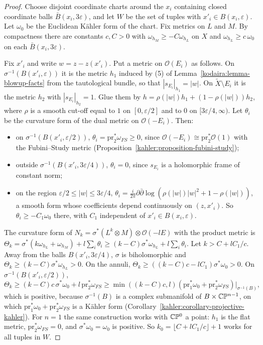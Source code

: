 \begin{proof}
Choose disjoint coordinate charts around the $x_i$ containing closed coordinate balls $\bar B(x_i, 3\varepsilon)$, and let $W$ be the set of tuples with
$x'_i \in B(x_i, \varepsilon)$. Let $\omega_0$ be the Euclidean K\"ahler form of the chart. Fix metrics on $L$ and $M$. By compactness there are
constants $c, C > 0$ with $\omega_{h_M} \geq -C\omega_{h_L}$ on $X$ and $\omega_{h_L} \geq c\,\omega_0$ on each $\bar B(x_i, 3\varepsilon)$.

Fix $x'_i$ and write $w = z - z(x'_i)$. Put a metric on $\mathcal{O}(E_i)$ as follows. On $\sigma^{-1}(B(x'_i, \varepsilon))$ it is the metric $h_1$
induced by (5) of Lemma~\ref{kodaira:lemma-blowup-facts} from the tautological bundle, so that $|s_{E_i}|_{h_1} = |w|$. On $\tilde X \setminus E_i$ it is
the metric $h_2$ with $|s_{E_i}|_{h_2} = 1$. Glue them by $h = \rho(|w|)h_1 + (1 - \rho(|w|))h_2$, where $\rho$ is a smooth cut-off equal to $1$ on
$[0, \varepsilon/2]$ and to $0$ on $[3\varepsilon/4, \infty)$. Let $\theta_i$ be the curvature form of the dual metric on $\mathcal{O}(-E_i)$. Then:
\begin{itemize}
\item on $\sigma^{-1}(B(x'_i, \varepsilon/2))$, $\theta_i = \mathrm{pr}_2^*\omega_{FS} \geq 0$, since $\mathcal{O}(-E_i) \cong \mathrm{pr}_2^*\mathcal{O}(1)$ with the
Fubini--Study metric (Proposition~\ref{kahler:proposition-fubini-study});
\item outside $\sigma^{-1}(B(x'_i, 3\varepsilon/4))$, $\theta_i = 0$, since $s_{E_i}$ is a holomorphic frame of constant norm;
\item on the region $\varepsilon/2 \leq |w| \leq 3\varepsilon/4$, $\theta_i = \frac{i}{2\pi}\partial\bar\partial\log\left(\rho(|w|)|w|^2 + 1 - \rho(|w|)\right)$, a
smooth form whose coefficients depend continuously on $(z, x'_i)$. So $\theta_i \geq -C_1\omega_0$ there, with $C_1$ independent of
$x'_i \in B(x_i, \varepsilon)$.
\end{itemize}
The curvature form of $N_k = \sigma^*(L^k \otimes M) \otimes \mathcal{O}(-lE)$ with the product metric is
$\Theta_k = \sigma^*(k\omega_{h_L} + \omega_{h_M}) + l\sum_i\theta_i \geq (k - C)\sigma^*\omega_{h_L} + l\sum_i\theta_i$. Let $k > C + lC_1/c$. Away from the
balls $B(x'_i, 3\varepsilon/4)$, $\sigma$ is biholomorphic and $\Theta_k \geq (k - C)\sigma^*\omega_{h_L} > 0$. On the annuli,
$\Theta_k \geq ((k - C)c - lC_1)\sigma^*\omega_0 > 0$. On $\sigma^{-1}(B(x'_i, \varepsilon/2))$,
\[
\Theta_k \geq (k - C)c\,\sigma^*\omega_0 + l\,\mathrm{pr}_2^*\omega_{FS} \geq \min((k - C)c, l)\left(\mathrm{pr}_1^*\omega_0 + \mathrm{pr}_2^*\omega_{FS}\right)\big|_{\sigma^{-1}(B)} ,
\]
which is positive, because $\sigma^{-1}(B)$ is a complex submanifold of $B \times \mathbb{C}\mathbb{P}^{n-1}$, on which $\mathrm{pr}_1^*\omega_0 + \mathrm{pr}_2^*\omega_{FS}$ is a
K\"ahler form (Corollary~\ref{kahler:corollary-projective-kahler}). For $n = 1$ the same construction works with $\mathbb{C}\mathbb{P}^0$ a point: $h_1$ is the
flat metric, $\mathrm{pr}_2^*\omega_{FS} = 0$, and $\sigma^*\omega_0 = \omega_0$ is positive. So $k_0 = \lfloor C + lC_1/c\rfloor + 1$ works for all
tuples in $W$.
\end{proof}

